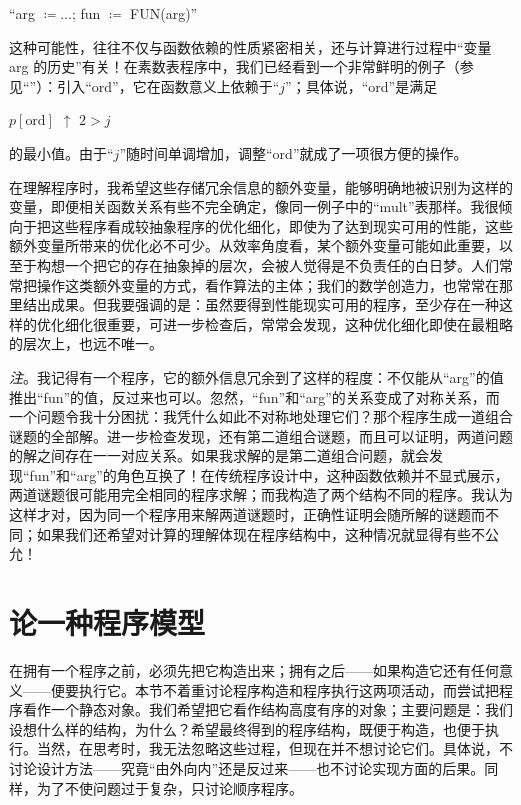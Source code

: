 \documentclass[twoside,11pt,fontset=none]{ctexbook}
\begin{document}
{
	\setlength{\parindent}{8em}
	\hspace{-.4em}``arg $\coloneq\dots$; fun $\coloneq$ FUN(arg)''
}
\medskip

这种可能性，往往不仅与函数依赖的性质紧密相关，还与计算进行过程中“变量 arg 的历史”有关！在素数表程序中，我们已经看到一个非常鲜明的例子（参见“”）：引入“ord”，它在函数意义上依赖于“$j$”；具体说，“ord”是满足
\medskip

{
	\setlength{\parindent}{8em}
	$p[\text{ord}]$ $\uparrow$ $2 > j$
}
\medskip

\noindent
的最小值。由于“$j$”随时间单调增加，调整“ord”就成了一项很方便的操作。

在理解程序时，我希望这些存储冗余信息的额外变量，能够明确地被识别为这样的变量，即便相关函数关系有些不完全确定，像同一例子中的“mult”表那样。我很倾向于把这些程序看成较抽象程序的优化细化，即使为了达到现实可用的性能，这些额外变量所带来的优化必不可少。从效率角度看，某个额外变量可能如此重要，以至于构想一个把它的存在抽象掉的层次，会被人觉得是不负责任的白日梦。人们常常把操作这类额外变量的方式，看作算法的主体；我们的数学创造力，也常常在那里结出成果。但我要强调的是：虽然要得到性能现实可用的程序，至少存在一种这样的优化细化很重要，可进一步检查后，常常会发现，这种优化细化即使在最粗略的层次上，也远不唯一。

\noindent
\textit{注}。我记得有一个程序，它的额外信息冗余到了这样的程度：不仅能从“arg”的值推出“fun”的值，反过来也可以。忽然，“fun”和“arg”的关系变成了对称关系，而一个问题令我十分困扰：我凭什么如此不对称地处理它们？那个程序生成一道组合谜题的全部解。进一步检查发现，还有第二道组合谜题，而且可以证明，两道问题的解之间存在一一对应关系。如果我求解的是第二道组合问题，就会发现“fun”和“arg”的角色互换了！在传统程序设计中，这种函数依赖并不显式展示，两道谜题很可能用完全相同的程序求解；而我构造了两个结构不同的程序。我认为这样才对，因为同一个程序用来解两道谜题时，正确性证明会随所解的谜题而不同；如果我们还希望对计算的理解体现在程序结构中，这种情况就显得有些不公允！

\section[论一种程序模型]{论一种程序模型}
\label{eq:program-model}

在拥有一个程序之前，必须先把它构造出来；拥有之后——如果构造它还有任何意义——便要执行它。本节不着重讨论程序构造和程序执行这两项活动，而尝试把程序看作一个静态对象。我们希望把它看作结构高度有序的对象；主要问题是：我们设想什么样的结构，为什么？希望最终得到的程序结构，既便于构造，也便于执行。当然，在思考时，我无法忽略这些过程，但现在并不想讨论它们。具体说，不讨论设计方法——究竟“由外向内”还是反过来——也不讨论实现方面的后果。同样，为了不使问题过于复杂，只讨论顺序程序。
\end{document}
